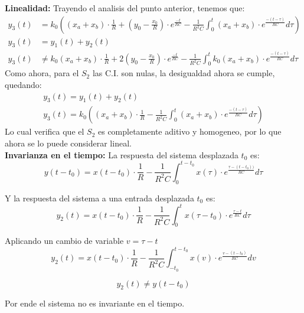 \documentclass[12pt,a4paper]{report}
\begin{document}
\begin{enumerate}[label=\alph*)]
      \textbf{Linealidad:} Trayendo el analisis del punto anterior, tenemos que:
      \begin{align*}
        y_3(t) &= k_0\left((x_a + x_b) \cdot \frac{1}{R} + \left(y_0 - \frac{x_0}{R}\right) \cdot e^{\frac{-t}{RC}} -
          \frac{1}{R^2C} \int_{0}^{t} (x_a + x_b) \cdot e^{\frac{-(t-\tau)}{RC}} d\tau\right)\\[12pt]
        y_3(t) &= y_1(t) + y_2(t)\\[6pt]
        y_3(t) &\neq k_0(x_a + x_b) \cdot \frac{1}{R} + 2\left(y_0 - \frac{x_0}{R}\right) \cdot
          e^{\frac{-t}{RC}} - \frac{1}{R^2C} \int_{0}^{t} k_0(x_a + x_b) \cdot e^{\frac{-(t-\tau)}{RC}} d\tau
      \end{align*}
      Como ahora, para el $S_2$ las C.I. son nulas, la desigualdad ahora se cumple, quedando:
      \begin{gather*}
        y_3(t) = y_1(t) + y_2(t)\\[6pt]
        y_3(t) = k_0\left((x_a + x_b) \cdot \frac{1}{R} - \frac{1}{R^2C} \int_{0}^{t} (x_a + x_b) \cdot
        e^{\frac{-(t-\tau)}{RC}} d\tau\right)
      \end{gather*}
      Lo cual verifica que el $S_2$ es completamente aditivo y homogeneo, por lo que ahora se lo puede considerar
      lineal.\\

      \textbf{Invarianza en el tiempo:} La respuesta del sistema desplazada $t_0$ es:
      $$y(t - t_0) = x(t - t_0) \cdot \frac{1}{R}- \frac{1}{R^2C} \int_{0}^{t - t_0} x(\tau) \cdot
      e^{\frac{\tau-(t - t_0))}{RC}} d\tau$$

      Y la respuesta del sistema a una entrada desplazada $t_0$ es:
      $$y_2(t) = x(t-t_0) \cdot \frac{1}{R}- \frac{1}{R^2C} \int_{0}^{t} x(\tau - t_0) \cdot
      e^{\frac{\tau-t}{RC}} d\tau$$

      Aplicando un cambio de variable $v= \tau-t$
      $$y_2(t) = x(t-t_0) \cdot \frac{1}{R}- \frac{1}{R^2C} \int_{-t_0}^{t-t_0} x(v) \cdot
      e^{\frac{v-(t-t_0)}{RC}} dv$$

      $$y_2(t) \neq y(t-t_0)$$

      Por ende el sistema no es invariante en el tiempo.


\end{enumerate}
\end{document}
